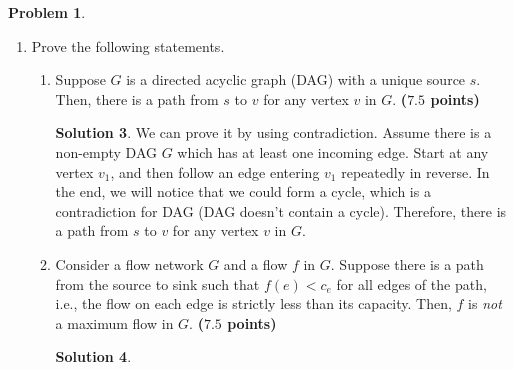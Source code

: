 \documentclass{article}
\theoremstyle{definition}
\newtheorem{problem}{Problem}
\newtheorem*{solution*}{Solution}
\newenvironment{solution}{\begin{solution*}}{{} \end{solution*}}
\newcommand{\grade}[1]{\hfill{\textbf{($\mathbf{#1}$ points)}}}
\begin{document}
\begin{problem}
\begin{enumerate}[label=(\alph*)]
\begin{enumerate}[label=(\roman*)]
\begin{solution}
		True.
		
		All NP-complete problems are also in NP by definition and so if P=NP, they all can be solved in polynomial time also.
		
		\end{solution}
		\vfill
				
		\item If P $\neq$ NP, then no problem in NP can be solved in polynomial time. \grade{2.5}
	\medskip
		\begin{solution}
		
		False.
		
		There are some problem in NP can be verified in polynomial time but cannot be solved in polynomial time.
		
		\end{solution}
	\end{enumerate} 

	\vfill
	
\newpage
	
	\item Prove the following statements.  
	\begin{enumerate}[label=(\roman*)]
		\item Suppose $G$ is a directed acyclic graph (DAG) with a unique source $s$. Then, there is a path from $s$ to $v$ for any vertex $v$ in $G$. \grade{7.5}
	
		\medskip
		\begin{solution}
		
		We can prove it by using contradiction. Assume there is a non-empty DAG $G$ which has at least one incoming edge. Start at any vertex $v_1$, and then follow an edge entering $v_1$ repeatedly in reverse. In the end, we will notice that we could form a cycle, which is a contradiction for DAG (DAG doesn't contain a cycle). Therefore, there is a path from $s$ to $v$ for any vertex $v$ in $G$. 
		
		
		\end{solution}
		
	\newpage
		
		\item  Consider a flow network $G$ and a flow $f$ in $G$. Suppose there is a path from the source to sink such that $f(e) < c_e$ for all edges of the path, i.e., the flow on each edge is strictly less than its capacity. 
		Then, $f$ is \emph{not} a maximum flow in $G$. \grade{7.5}
		
			\medskip
		\begin{solution}
		

\end{solution}
\end{enumerate}
\end{enumerate}
\end{problem}
\end{document}
